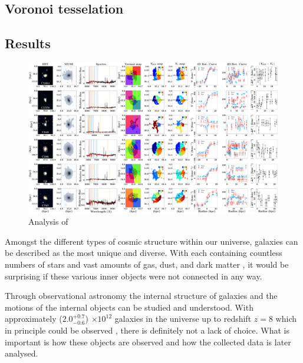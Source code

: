 \documentclass[12pt, twocolumn]{revtex4}    %
\begin{document}
\subsection{Voronoi tesselation}

\subsection{Results}

\onecolumngrid

\begin{figure}
\centering
\includegraphics[width=1.0\textheight,height=0.6\textwidth]{data/spectra_complete_velocities}
\vspace{1cm}  %
\captionsetup{justification=raggedright}
\caption[Tully-Fisher]{Analysis of }
\label{fig:multiple_spectra}
\end{figure}

\twocolumngrid


Amongst the different types of cosmic structure within our universe, galaxies can be described as the most unique and diverse. With each containing countless numbers of stars and vast amounts of gas, dust, and dark matter \citep{carroll_astro}, it would be surprising if these various inner objects were not connected in any way.

Through observational astronomy the internal structure of galaxies and the motions of the internal objects can be studied and understood. With approximately ($2.0^{+0.7}_{-0.6}$) $\times 10^{12}$ galaxies in the universe up to redshift $z=8$ which in principle could be observed \citep{conselice_galaxynumber}, there is definitely not a lack of choice. What is important is how these objects are observed and how the collected data is later analysed. 
\end{document}
